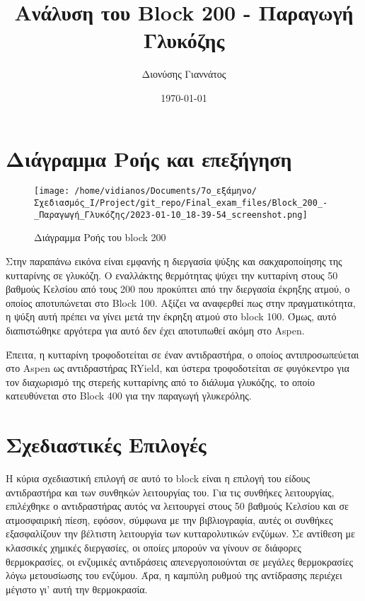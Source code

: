 \documentclass[11pt]{article}
\author{Διονύσης Γιαννάτος}
\date{\today}
\title{Ανάλυση του Block 200 - Παραγωγή Γλυκόζης}
\begin{document}
\maketitle
\tableofcontents

\renewcommand{\abstractname}{Περίληψη}
\renewcommand{\tablename}{Πίνακας}
\renewcommand{\figurename}{Σχήμα}
\renewcommand\listingscaption{Κώδικας}

\section{Διάγραμμα Ροής και επεξήγηση}
\label{sec:orgc0a70d9}
\begin{figure}[htbp]
\centering
\texttt{[image: /home/vidianos/Documents/7o\_εξάμηνο/Σχεδιασμός\_Ι/Project/git\_repo/Final\_exam\_files/Block\_200\_-\_Παραγωγή\_Γλυκόζης/2023-01-10\_18-39-54\_screenshot.png]}
\caption{Διάγραμμα Ροής του block 200}
\end{figure}

Στην παραπάνω εικόνα είναι εμφανής η διεργασία ψύξης και σακχαροποίησης
της κυτταρίνης σε γλυκόζη. Ο εναλλάκτης θερμότητας ψύχει την κυτταρίνη
στους 50 βαθμούς Κελσίου από τους 200 που προκύπτει από την διεργασία
έκρηξης ατμού, ο οποίος αποτυπώνεται στο Block 100. Αξίζει να αναφερθεί πως στην πραγματικότητα, η ψύξη αυτή πρέπει να γίνει μετά την έκρηξη ατμού στο block 100. Όμως, αυτό διαπιστώθηκε αργότερα για αυτό δεν έχει αποτυπωθεί ακόμη στο Aspen.

Έπειτα, η κυτταρίνη τροφοδοτείται σε έναν αντιδραστήρα, ο οποίος αντιπροσωπεύεται στο Aspen ως αντιδραστήρας RYield, και ύστερα τροφοδοτείται σε φυγόκεντρο για τον
διαχωρισμό της στερεής κυτταρίνης από το διάλυμα γλυκόζης, το οποίο
κατευθύνεται στο Block 400 για την παραγωγή γλυκερόλης.

\section{Σχεδιαστικές Επιλογές}
\label{sec:org30421d4}
Η κύρια σχεδιαστική επιλογή σε αυτό το block είναι η επιλογή του είδους
αντιδραστήρα και των συνθηκών λειτουργίας του. Για τις συνθήκες
λειτουργίας, επιλέχθηκε ο αντιδραστήρας αυτός να λειτουργεί στους 50
βαθμούς Κελσίου και σε ατμοσφαιρική πίεση, εφόσον, σύμφωνα με την
βιβλιογραφία, αυτές οι συνθήκες εξασφαλίζουν την βέλτιστη λειτουργία των
κυτταρολυτικών ενζύμων. Σε αντίθεση με κλασσικές χημικές διεργασίες, οι
οποίες μπορούν να γίνουν σε διάφορες θερμοκρασίες, οι ενζυμικές
αντιδράσεις απενεργοποιούνται σε μεγάλες θερμοκρασίες λόγω μετουσίωσης
του ενζύμου. Άρα, η καμπύλη ρυθμού της αντίδρασης περιέχει μέγιστο γι'
αυτή την θερμοκρασία.
\end{document}
